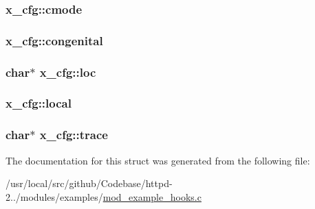 \subsubsection[{\texorpdfstring{cmode}{cmode}}]{ x\+\_\+cfg\+::cmode}\hypertarget{structx__cfg_aa20ee6877f74843cf775ecfeee6bf2d1}{}\label{structx__cfg_aa20ee6877f74843cf775ecfeee6bf2d1}
\subsubsection[{\texorpdfstring{congenital}{congenital}}]{ x\+\_\+cfg\+::congenital}\hypertarget{structx__cfg_aa804c441c250348c0bfc29fd86e57e91}{}\label{structx__cfg_aa804c441c250348c0bfc29fd86e57e91}
\subsubsection[{\texorpdfstring{loc}{loc}}]{\setlength{\rightskip}{0pt plus 5cm}char$\ast$ x\+\_\+cfg\+::loc}\hypertarget{structx__cfg_a7b3d8ab6c76da45fbaec99a590b8ff2f}{}\label{structx__cfg_a7b3d8ab6c76da45fbaec99a590b8ff2f}
\subsubsection[{\texorpdfstring{local}{local}}]{ x\+\_\+cfg\+::local}\hypertarget{structx__cfg_a5e78fdd3a4c42ad4b6ac0444d55c5eff}{}\label{structx__cfg_a5e78fdd3a4c42ad4b6ac0444d55c5eff}
\subsubsection[{\texorpdfstring{trace}{trace}}]{\setlength{\rightskip}{0pt plus 5cm}char$\ast$ x\+\_\+cfg\+::trace}\hypertarget{structx__cfg_a64b3ffbe4c3bc5a9730aff9f4673eef7}{}\label{structx__cfg_a64b3ffbe4c3bc5a9730aff9f4673eef7}


The documentation for this struct was generated from the following file\+:\begin{DoxyCompactItemize}
\item 
/usr/local/src/github/\+Codebase/httpd-\/2../modules/examples/\hyperlink{mod__example__hooks_8c}{mod\+\_\+example\+\_\+hooks.\+c}\end{DoxyCompactItemize}
